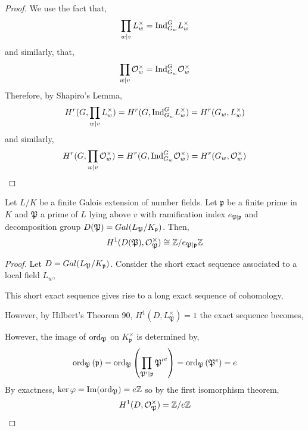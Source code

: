 \documentclass[12pt]{extarticle}
\begin{document}
\begin{proof}
We use the fact that,
\[ \prod_{w \mid v} L_w^\times = \mathrm{Ind}^{G}_{G_w} L_{w}^\times \]
and similarly, that,
\[ \prod_{w \mid v} \mathcal{O}_{w}^\times = \mathrm{Ind}^{G}_{G_w} \mathcal{O}_{w}^\times \]
Therefore, by Shapiro’s Lemma,
\[ H^r(G, \prod_{w \mid v} L_w^\times) = H^r(G, \mathrm{Ind}^{G}_{G_w} L_{w}^\times) = H^r(G_w, L_{w}^\times) \]
and similarly,
\[ H^r(G, \prod_{w \mid v} \mathcal{O}_{w}^\times) = H^r(G, \mathrm{Ind}^{G}_{G_w} \mathcal{O}_{w}^\times) = H^r(G_w, \mathcal{O}_{w}^\times) \]
\end{proof}

\begin{lemma} \label{ramification}
Let $L/K$ be a finite Galois extension of number fields. Let $\mathfrak{p}$ be a finite prime in $K$ and $\mathfrak{P}$ a prime of $L$ lying above $v$ with ramification index $e_{\mathfrak{P} | \mathfrak{p}}$ and decomposition group $D(\mathfrak{P}) = Gal \small(L_{\mathfrak{P}}/K_{\mathfrak{p}} \small)$. Then, 
\[H^1(D(\mathfrak{P}), \mathcal{O}_{\mathfrak{P}}^\times) \cong \mathbb{Z} / e_{\mathfrak{P} | \mathfrak{p}} \mathbb{Z}\]
\end{lemma}

\begin{proof}
Let $D = Gal \small(L_{\mathfrak{P}}/K_{\mathfrak{p}} \small)$. Consider the short exact sequence associated to a local field $L_w$,
\begin{center}
\end{center}
This short exact sequence gives rise to a long exact sequence of cohomology,
\begin{center}
\end{center}
However, by Hilbert's Theorem 90, $H^1(D, L_\mathfrak{P}^\times) = 1$ the exact sequence becomes,
\begin{center}
\end{center}
However, the image of $\mathrm{ord}_{\mathfrak{P}}$ on $K^\times_{\mathfrak{p}}$ is determined by, 
\[\mathrm{ord}_{\mathfrak{P}} \left( \mathfrak{p} \right) = \mathrm{ord}_{\mathfrak{P}} \left( \prod_{\mathfrak{P'} \mid \mathfrak{p}} \mathfrak{P'}^e \right) = \mathrm{ord}_{\mathfrak{P}} \left( \mathfrak{P}^e \right) = e\]
By exactness, $\ker{\varphi} = \mathrm{Im}(\mathrm{ord}_{\mathfrak{P}}) = e \mathbb{Z}$ so by the first isomorphism theorem,
\[ H^1(D, \mathcal{O}_{\mathfrak{P}}^\times) = \mathbb{Z} / e \mathbb{Z} \]
\end{proof}
\end{document}
